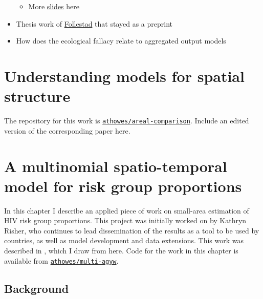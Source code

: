 \documentclass[a4paper, nobind]{templates/ociamthesis}
\providecommand{\tightlist}{%
  \setlength{\itemsep}{0pt}\setlength{\parskip}{0pt}}
\begin{document}
\begin{itemize}
  \begin{itemize}
  \tightlist
  \item
    More \href{https://informatique-mia.inrae.fr/reseau-resste/sites/default/files/2020-09/slides-Lindgren_Avignon2018.pdf}{slides} here
  \end{itemize}
\item
  Thesis work of \href{https://cds.cern.ch/record/639625/files/sis-2003-305.pdf}{Follestad} that stayed as a preprint
\item
  How does the ecological fallacy relate to aggregated output models
\end{itemize}

\hypertarget{understanding-models-for-spatial-structure}{%
\chapter{Understanding models for spatial structure}\label{understanding-models-for-spatial-structure}}

\adjustmtc
{}

The repository for this work is \href{https://github.com/athowes/areal-comparison}{\texttt{athowes/areal-comparison}}.
Include an edited version of the corresponding paper here.

\hypertarget{a-multinomial-spatio-temporal-model-for-risk-group-proportions}{%
\chapter{A multinomial spatio-temporal model for risk group proportions}\label{a-multinomial-spatio-temporal-model-for-risk-group-proportions}}

\adjustmtc
{}

In this chapter I describe an applied piece of work on small-area estimation of HIV risk group proportions.
This project was initially worked on by Kathryn Risher, who continues to lead dissemination of the results as a tool to be used by countries, as well as model development and data extensions.
This work was described in \textcite{howes2022spatio}, which I draw from here.
Code for the work in this chapter is available from \href{https://github.com/athowes/multi-agyw}{\texttt{athowes/multi-agyw}}.

\hypertarget{background-1}{%
\section{Background}\label{background-1}}
\end{document}
